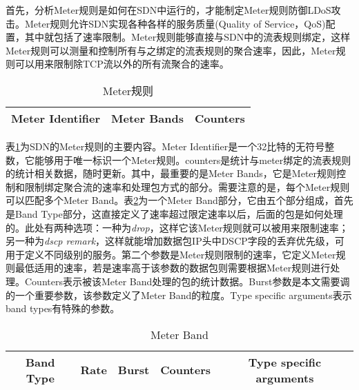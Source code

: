 首先，分析Meter规则是如何在SDN中运行的，才能制定Meter规则防御LDoS攻击。Meter规则允许SDN实现各种各样的服务质量(Quality of Service，QoS)配置，其中就包括了速率限制。Meter规则能够直接与SDN中的流表规则绑定，这样Meter规则可以测量和控制所有与之绑定的流表规则的聚合速率，因此，Meter规则可以用来限制除TCP流以外的所有流聚合的速率。

\begin{table}[htbp]
	\centering  %
	\caption{Meter规则}  %
	\label{table:meter}  %
	\begin{tabular}{|c|c|c|}  
		\hline  %
        Meter Identifier & Meter Bands& Counters \\  %
        \hline
		
	\end{tabular}
\end{table}
表\ref{table:meter}为SDN的Meter规则的主要内容。Meter Identifier是一个32比特的无符号整数，它能够用于唯一标识一个Meter规则。counters是统计与meter绑定的流表规则的统计相关数据，随时更新。其中，最重要的是Meter Bands，它是Meter规则控制和限制绑定聚合流的速率和处理包方式的部分。需要注意的是，每个Meter规则可以匹配多个Meter Band。表\ref{table:meterbands}为一个Meter Band部分，它由五个部分组成，首先是Band Type部分，这直接定义了速率超过限定速率以后，后面的包是如何处理的。此处有两种选项：一种为\emph{drop}，这样它该Meter规则就可以被用来限制速率；另一种为\emph{dscp remark}，这样就能增加数据包IP头中DSCP字段的丢弃优先级，可用于定义不同级别的服务。第二个参数是Meter规则限制的速率，它定义Meter规则最低适用的速率，若是速率高于该参数的数据包则需要根据Meter规则进行处理。Counters表示被该Meter Band处理的包的统计数据。Burst参数是本文需要调的一个重要参数，该参数定义了Meter Band的粒度。Type specific arguments表示band types有特殊的参数。
\begin{table}[htbp]
	\centering  %
	\caption{Meter Band}  %
	\label{table:meterbands}  %
	\begin{tabular}{|c|c|c|c|c|}  
		\hline  %
        Band Type & Rate & Burst & Counters & Type specific arguments \\  %
        \hline
		
	\end{tabular}
\end{table}

